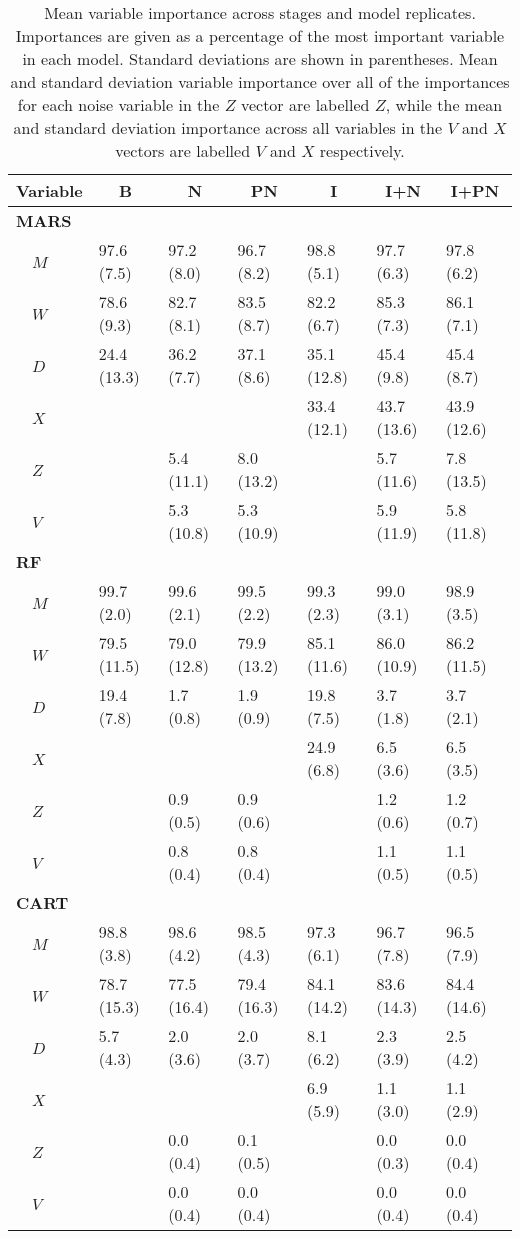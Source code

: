\documentclass[12pt]{article}
\begin{document}
\begin{table}[!htbp]
\caption[Mean variable importance across stages and model replicates]{Mean variable importance across stages and model replicates. Importances are given as a percentage of the most important variable in each model. Standard deviations are shown in parentheses. Mean and standard deviation variable importance over all of the importances for each noise variable in the $Z$ vector are labelled $Z$, while the mean and standard deviation importance across all variables in the $V$ and $X$ vectors are labelled $V$ and $X$ respectively. \label{tab:imp}}
\begin{center}
\begin{tabular}{lllllll}
\toprule
\multicolumn{1}{l}{Variable}&\multicolumn{1}{c}{B}&\multicolumn{1}{c}{N}&\multicolumn{1}{c}{PN}&\multicolumn{1}{c}{I}&\multicolumn{1}{c}{I+N}&\multicolumn{1}{c}{I+PN}\tabularnewline
\midrule
{\bfseries MARS}&&&&&&\tabularnewline
~~$M$&97.6 (7.5)&97.2 (8.0)&96.7 (8.2)&98.8 (5.1)&97.7 (6.3)&97.8 (6.2)\tabularnewline
~~$W$&78.6 (9.3)&82.7 (8.1)&83.5 (8.7)&82.2 (6.7)&85.3 (7.3)&86.1 (7.1)\tabularnewline
~~$D$&24.4 (13.3)&36.2 (7.7)&37.1 (8.6)&35.1 (12.8)&45.4 (9.8)&45.4 (8.7)\tabularnewline
~~$X$&&&&33.4 (12.1)&43.7 (13.6)&43.9 (12.6)\tabularnewline
~~$Z$&&5.4 (11.1)&8.0 (13.2)&&5.7 (11.6)&7.8 (13.5)\tabularnewline
~~$V$&&5.3 (10.8)&5.3 (10.9)&&5.9 (11.9)&5.8 (11.8)\tabularnewline
\midrule
{\bfseries RF}&&&&&&\tabularnewline
~~$M$&99.7 (2.0)&99.6 (2.1)&99.5 (2.2)&99.3 (2.3)&99.0 (3.1)&98.9 (3.5)\tabularnewline
~~$W$&79.5 (11.5)&79.0 (12.8)&79.9 (13.2)&85.1 (11.6)&86.0 (10.9)&86.2 (11.5)\tabularnewline
~~$D$&19.4 (7.8)&1.7 (0.8)&1.9 (0.9)&19.8 (7.5)&3.7 (1.8)&3.7 (2.1)\tabularnewline
~~$X$&&&&24.9 (6.8)&6.5 (3.6)&6.5 (3.5)\tabularnewline
~~$Z$&&0.9 (0.5)&0.9 (0.6)&&1.2 (0.6)&1.2 (0.7)\tabularnewline
~~$V$&&0.8 (0.4)&0.8 (0.4)&&1.1 (0.5)&1.1 (0.5)\tabularnewline
\midrule
{\bfseries CART}&&&&&&\tabularnewline
~~$M$&98.8 (3.8)&98.6 (4.2)&98.5 (4.3)&97.3 (6.1)&96.7 (7.8)&96.5 (7.9)\tabularnewline
~~$W$&78.7 (15.3)&77.5 (16.4)&79.4 (16.3)&84.1 (14.2)&83.6 (14.3)&84.4 (14.6)\tabularnewline
~~$D$&5.7 (4.3)&2.0 (3.6)&2.0 (3.7)&8.1 (6.2)&2.3 (3.9)&2.5 (4.2)\tabularnewline
~~$X$&&&&6.9 (5.9)&1.1 (3.0)&1.1 (2.9)\tabularnewline
~~$Z$&&0.0 (0.4)&0.1 (0.5)&&0.0 (0.3)&0.0 (0.4)\tabularnewline
~~$V$&&0.0 (0.4)&0.0 (0.4)&&0.0 (0.4)&0.0 (0.4)\tabularnewline
\bottomrule
\end{tabular}
\end{center}
\end{table}
\end{document}
